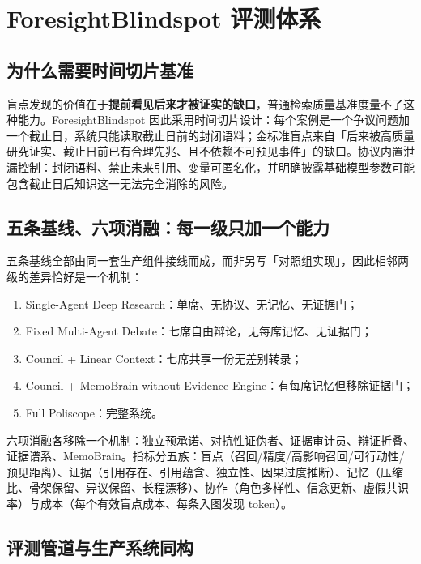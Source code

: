\section{ForesightBlindspot 评测体系}

\subsection{为什么需要时间切片基准}

盲点发现的价值在于\textbf{提前看见后来才被证实的缺口}，普通检索质量基准度量不了这种能力。ForesightBlindspot 因此采用时间切片设计：每个案例是一个争议问题加一个截止日，系统只能读取截止日前的封闭语料；金标准盲点来自「后来被高质量研究证实、截止日前已有合理先兆、且不依赖不可预见事件」的缺口。协议内置泄漏控制：封闭语料、禁止未来引用、变量可匿名化，并明确披露基础模型参数可能包含截止日后知识这一无法完全消除的风险。

\subsection{五条基线、六项消融：每一级只加一个能力}

五条基线全部由同一套生产组件接线而成，而非另写「对照组实现」，因此相邻两级的差异恰好是一个机制：

\begin{enumerate}[leftmargin=1.6em, itemsep=2pt]
\item Single-Agent Deep Research：单席、无协议、无记忆、无证据门；
\item Fixed Multi-Agent Debate：七席自由辩论，无每席记忆、无证据门；
\item Council + Linear Context：七席共享一份无差别转录；
\item Council + MemoBrain without Evidence Engine：有每席记忆但移除证据门；
\item Full Poliscope：完整系统。
\end{enumerate}

六项消融各移除一个机制：独立预承诺、对抗性证伪者、证据审计员、辩证折叠、证据谱系、MemoBrain。指标分五族：盲点（召回/精度/高影响召回/可行动性/预见距离）、证据（引用存在、引用蕴含、独立性、因果过度推断）、记忆（压缩比、骨架保留、异议保留、长程漂移）、协作（角色多样性、信念更新、虚假共识率）与成本（每个有效盲点成本、每条入图发现 token）。

\subsection{评测管道与生产系统同构}

